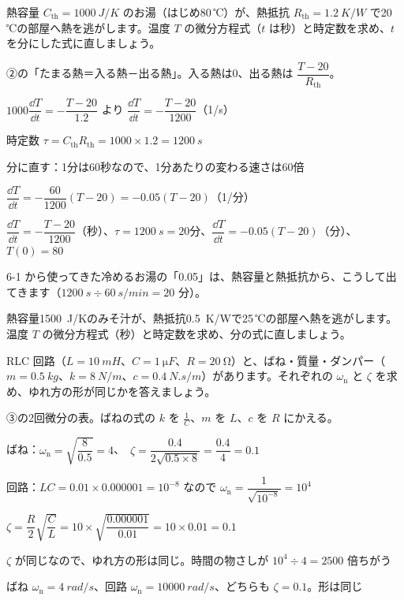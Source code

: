 \begin{reidai}
熱容量 $C_{\mathrm{th}}=\qty{1000}{J/K}$ のお湯（はじめ80\,℃）が、熱抵抗 $R_{\mathrm{th}}=\qty{1.2}{K/W}$ で20\,℃の部屋へ熱を逃がします。温度 $T$ の微分方程式（$t$ は秒）と時定数を求め、$t$ を分にした式に直しましょう。\par
\kangaekata ②の「たまる熱＝入る熱－出る熱」。入る熱は0、出る熱は $\dfrac{T-20}{R_{\mathrm{th}}}$。\par
\shiki\kvips{}\zw{} $1000\dfrac{\dd T}{\dd t}=-\dfrac{T-20}{1.2}$ より $\dfrac{\dd T}{\dd t}=-\dfrac{T-20}{1200}$（1/s）\par
\kvipa 時定数 $\tau=C_{\mathrm{th}}R_{\mathrm{th}}=1000\times1.2=\qty{1200}{s}$\par
\kvipa 分に直す：1分は60秒なので、1分あたりの変わる速さは60倍\par
\kvipa $\dfrac{\dd T}{\dd t}=-\dfrac{60}{1200}(T-20)=-0.05(T-20)$（1/分）\par
\kotae\kvips{}\zw{} $\dfrac{\dd T}{\dd t}=-\dfrac{T-20}{1200}$（秒）、$\tau=\qty{1200}{s}=20$分、$\dfrac{\dd T}{\dd t}=-0.05(T-20)$（分）、$T(0)=80$
\end{reidai}
6-1 から使ってきた冷めるお湯の「0.05」は、熱容量と熱抵抗から、こうして出てきます（$\qty{1200}{s}\div\qty{60}{s/min}=20$ 分）。

\begin{jibun}
熱容量\qty{1500}{J/K}のみそ汁が、熱抵抗\qty{0.5}{K/W}で25\,℃の部屋へ熱を逃がします。温度 $T$ の微分方程式（秒）と時定数を求め、分の式に直しましょう。
\end{jibun}

\begin{reidai}
RLC 回路（$L=\qty{10}{mH}$、$C=\qty{1}{\micro F}$、$R=\qty{20}{\ohm}$）と、ばね・質量・ダンパー（$m=\qty{0.5}{kg}$、$k=\qty{8}{N/m}$、$c=\qty{0.4}{N.s/m}$）があります。それぞれの $\omega_{\mathrm n}$ と $\zeta$ を求め、ゆれ方の形が同じかを答えましょう。\par
\kangaekata ③の2回微分の表。ばねの式の $k$ を $\frac1C$、$m$ を $L$、$c$ を $R$ にかえる。\par
\shiki\kvips{}\zw{} ばね：$\omega_{\mathrm n}=\sqrt{\dfrac{8}{0.5}}=4$、\ $\zeta=\dfrac{0.4}{2\sqrt{0.5\times8}}=\dfrac{0.4}{4}=0.1$\par
\kvipa 回路：$LC=0.01\times0.000001=10^{-8}$ なので $\omega_{\mathrm n}=\dfrac{1}{\sqrt{10^{-8}}}=10^{4}$\par
\kvipa \phantom{回路：}$\zeta=\dfrac{R}{2}\sqrt{\dfrac{C}{L}}=10\times\sqrt{\dfrac{0.000001}{0.01}}=10\times0.01=0.1$\par
\kvipa $\zeta$ が同じなので、ゆれ方の形は同じ。時間の物さしが $10^4\div4=2500$ 倍ちがう\par
\kotae\kvips{}\zw{} ばね $\omega_{\mathrm n}=\qty{4}{rad/s}$、回路 $\omega_{\mathrm n}=\qty{10000}{rad/s}$、どちらも $\zeta=0.1$。形は同じ
\end{reidai}

